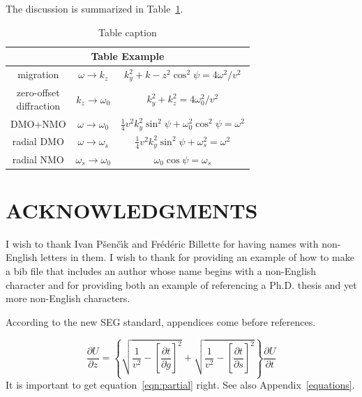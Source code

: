 \documentclass{article}
\begin{document}
The discussion is summarized in Table~\ref{tbl:example}.

\begin{table}
  \centering
  \begin{tabular}{|c|c|c|}
    \hline
    \multicolumn{3}{|c|}{Table Example} \\
    \hline
    migration\rule[-2ex]{0ex}{5ex} & 
    $\omega \rightarrow k_z$ & $k_y^2+k-z^2\cos^2 \psi=4\omega^2/v^2$ \\
    \hline
    \parbox{1in}{zero-offset\\diffraction}\rule[-4ex]{0ex}{8ex} &
    $k_z\rightarrow\omega_0$ &
    $k_y^2+k_z^2=4\omega_0^2/v^2$ \\
    \hline
    DMO+NMO\rule[-2ex]{0in}{5ex} & $\omega\rightarrow\omega_0$ & $\frac{1}{4}
    v^2k_y^2\sin^2\psi+\omega_0^2\cos^2\psi=\omega^2$ \\
    \hline
    radial DMO\rule[-2ex]{0in}{5ex} & $\omega\rightarrow\omega_s$ &
    $\frac{1}{4}v^2k_y^2\sin^2\psi+\omega_s^2=\omega^2$\\
    \hline
    radial NMO\rule[-2ex]{0in}{5ex} & $\omega_s\rightarrow\omega_0$ &
    $\omega_0\cos\psi=\omega_s$\\
    \hline
  \end{tabular}
  \caption{Table caption}
  \label{tbl:example}
\end{table}

\section{ACKNOWLEDGMENTS}

I wish to thank Ivan P\v{s}en\v{c}\'{\i}k and Fr\'ed\'eric Billette for having
names with non-English letters in them.  I wish to thank \cite{Cerveny} for
providing an example of how to make a bib file that includes an author
whose name begins with a non-English character and \cite{forgues96} for
providing both an example of referencing a Ph.D. thesis and yet more
non-English characters.


According to the new SEG standard, appendices come before references.

\begin{equation}
\frac{\partial U}{\partial z} = 
\left\{
  \sqrt{\frac{1}{v^2} - \left[\frac{\partial t}{\partial g}\right]^2} +
  \sqrt{\frac{1}{v^2} - \left[\frac{\partial t}{\partial s}\right]^2}
\right\}
\frac{\partial U}{\partial t}
\label{eqn:partial}
\end{equation}
It is important to get equation~\ref{eqn:partial} right. See also
Appendix~\ref{equations}.
\end{document}
